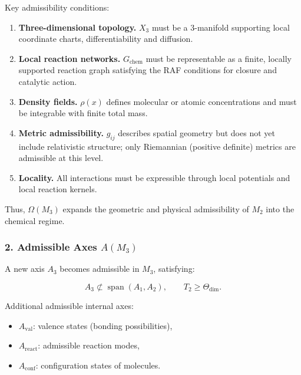 Key admissibility conditions:

\begin{enumerate}
    \item \textbf{Three-dimensional topology.}
    $X_3$ must be a 3-manifold supporting local coordinate charts,
    differentiability and diffusion.

    \item \textbf{Local reaction networks.}
    $G_{\mathrm{chem}}$ must be representable as a finite, locally supported
    reaction graph satisfying the RAF conditions for closure and catalytic action.

    \item \textbf{Density fields.}
    $\rho(x)$ defines molecular or atomic concentrations
    and must be integrable with finite total mass.

    \item \textbf{Metric admissibility.}
    $g_{ij}$ describes spatial geometry but does not yet include
    relativistic structure; only Riemannian (positive definite) metrics
    are admissible at this level.

    \item \textbf{Locality.}
    All interactions must be expressible through local potentials
    and local reaction kernels.
\end{enumerate}

Thus, $\Omega(M_3)$ expands the geometric and physical admissibility of $M_2$
into the chemical regime.

\subsubsection*{2. Admissible Axes \texorpdfstring{$A(M_3)$}{A(M_3)}}

A new axis $A_3$ becomes admissible in $M_3$, satisfying:

\[
A_3 \not\subset \operatorname{span}(A_1, A_2),
\qquad
T_2 \ge \Theta_{\mathrm{dim}}.
\]

Additional admissible internal axes:

\begin{itemize}
    \item $A_{\mathrm{val}}$: valence states (bonding possibilities),
    \item $A_{\mathrm{react}}$: admissible reaction modes,
    \item $A_{\mathrm{conf}}$: configuration states of molecules.
\end{itemize}

